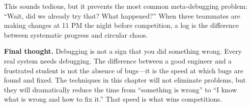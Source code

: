 This sounds tedious, but it prevents the most common meta-debugging problem: ``Wait, did we already try that? What happened?'' When three teammates are making changes at 11 PM the night before competition, a log is the difference between systematic progress and circular chaos.

\vspace{0.5em}

\textbf{Final thought.} Debugging is not a sign that you did something wrong. Every real system needs debugging. The difference between a good engineer and a frustrated student is not the absence of bugs---it is the speed at which bugs are found and fixed. The techniques in this chapter will not eliminate problems, but they will dramatically reduce the time from ``something is wrong'' to ``I know what is wrong and how to fix it.'' That speed is what wins competitions.
